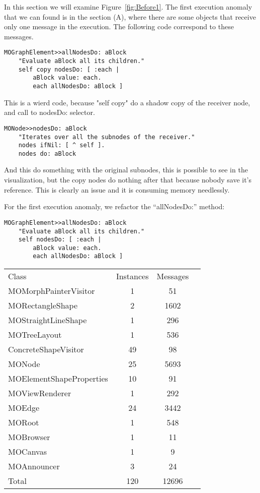 \documentclass{sig-alternate}
\newcommand{\figref}[1]{Figure~\ref{fig:#1}}
\begin{document}
In this section we will examine \figref{Before1}. The first execution anomaly that we can found is in the section (A), where there are some objects that receive only one message in the execution. The following code correspond to these messages.

\begin{lstlisting}[language=Smalltalk]
MOGraphElement>>allNodesDo: aBlock
	"Evaluate aBlock all its children."
	self copy nodesDo: [ :each |
		aBlock value: each.
		each allNodesDo: aBlock ]
\end{lstlisting} 

This is a wierd code, because "self copy" do a shadow copy of the receiver node, and call to nodesDo: selector.

\begin{lstlisting}[language=Smalltalk]
MONode>>nodesDo: aBlock
	"Iterates over all the subnodes of the receiver."	
	nodes ifNil: [ ^ self ].
	nodes do: aBlock
\end{lstlisting} 

And this do something with the original subnodes, this is possible to see in the visualization, but the copy nodes do nothing after that because nobody save it's reference. This is clearly an issue  and it is consuming memory needlessly.

For the first execution anomaly, we refactor the ``allNodesDo:'' method: 
\begin{lstlisting}[language=Smalltalk]
MOGraphElement>>allNodesDo: aBlock
	"Evaluate aBlock all its children."
	self nodesDo: [ :each |
		aBlock value: each.
		each allNodesDo: aBlock ]
\end{lstlisting} 

\begin{center}
   \begin{tabular}{|l||ccr|} \hline
	Class & Instances & Messages \\
	MOMorphPainterVisitor & 1 & 51	\\
	MORectangleShape & 2 & 1602	\\
	MOStraightLineShape & 1 & 296	\\
	MOTreeLayout & 1 & 536	\\
	ConcreteShapeVisitor & 49 & 98 \\
	MONode & 25 & 5693\\
	MOElementShapeProperties & 10 & 91\\
	MOViewRenderer & 1 & 292\\
	MOEdge & 24 & 3442\\
	MORoot & 1 & 548\\
	MOBrowser & 1 & 11\\
	MOCanvas & 1 & 9\\
	MOAnnouncer & 3 & 24\\
	Total & 120 & 12696 \\
   \end{tabular}
\end{center}
\end{document}
